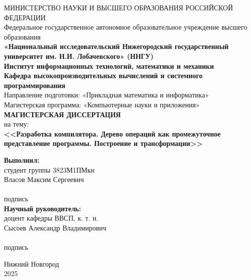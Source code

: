 \documentclass[a4paper,12pt]{extarticle}
\begin{document}
\begin{titlepage}
  \fontsize{14pt}{16.8pt}\selectfont
  \begin{center}
    МИНИСТЕРСТВО НАУКИ И ВЫСШЕГО ОБРАЗОВАНИЯ РОССИЙСКОЙ ФЕДЕРАЦИИ\\
    Федеральное государственное автономное образовательное учреждение высшего образования\\
    \textbf{«Национальный исследовательский Нижегородский государственный университет им. Н.И. Лобачевского» (ННГУ)}\\
    \vspace{1cm}
    \textbf{Институт информационных технологий, математики и механики}\\
    \textbf{Кафедра высокопроизводительных вычислений и системного программирования}\\
    Направление подготовки: «Прикладная математика и информатика»\\
    Магистерская программа: «Компьютерные науки и приложения»\\
    \vspace*{\fill}
    {\Large\textbf{МАГИСТЕРСКАЯ ДИССЕРТАЦИЯ}}\\
    \vspace{0.4cm}
    на тему:\\
    {\large\textbf{
      <<Разработка компилятора.
      Дерево операций как промежуточное представление программы.
      Построение и трансформации>>
    }}\\
    \vspace*{\fill}
  \end{center}
  \hfill
  \begin{minipage}{0.45\textwidth}
    \raggedright
    \textbf{Выполнил:}\\
    студент группы 3823М1ПМкн\\
    Власов Максим Сергеевич\\
    \vspace{0.4cm}
    \hrulefill\\
    \vspace*{-0.5\baselineskip}
    \noindent\hfill{\small подпись}\hfill\null\\
    \vspace{0.4cm}
    \textbf{Научный руководитель:}\\
    доцент кафедры ВВСП, к. т. н.\\
    Сысоев Александр Владимирович\\
    \vspace{0.4cm}
    \hrulefill\\
    \vspace*{-0.5\baselineskip}
    \noindent\hfill{\small подпись}\hfill\null\\
  \end{minipage}
  \vspace*{\fill}
  \begin{center}
    Нижний Новгород\\
    2025
  \end{center}
\end{titlepage}
\end{document}
